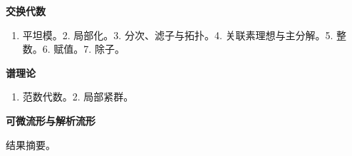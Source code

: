 \documentclass[UTF8,fontset=fandol,12pt,a4paper,oneside]{ctexbook}
\providecommand{\tightlist}{\setlength{\itemsep}{0pt}\setlength{\parskip}{0pt}}
\begin{document}
\textbf{交换代数}

\begin{enumerate}
\def\labelenumi{\arabic{enumi}.}
\tightlist
\item
  平坦模。2. 局部化。3. 分次、滤子与拓扑。4. 关联素理想与主分解。5. 整数。6. 赋值。7. 除子。
\end{enumerate}

\textbf{谱理论}

\begin{enumerate}
\def\labelenumi{\arabic{enumi}.}
\tightlist
\item
  范数代数。2. 局部紧群。
\end{enumerate}

\textbf{可微流形与解析流形}

结果摘要。

\mainmatter
\end{document}
